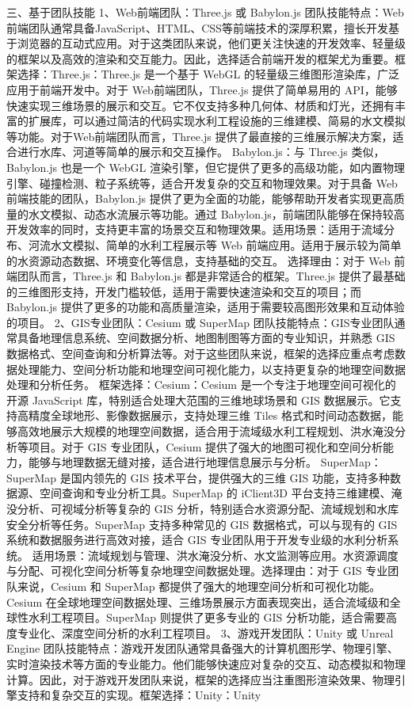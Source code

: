 {{{三、基于团队技能 1、Web前端团队：Three.js 或 Babylon.js 团队技能特点：Web前端团队通常具备JavaScript、HTML、CSS等前端技术的深厚积累，擅长开发基于浏览器的互动式应用。对于这类团队来说，他们更关注快速的开发效率、轻量级的框架以及高效的渲染和交互能力。因此，选择适合前端开发的框架尤为重要。框架选择：Three.js：Three.js 是一个基于 WebGL 的轻量级三维图形渲染库，广泛应用于前端开发中。对于 Web前端团队，Three.js 提供了简单易用的 API，能够快速实现三维场景的展示和交互。它不仅支持多种几何体、材质和灯光，还拥有丰富的扩展库，可以通过简洁的代码实现水利工程设施的三维建模、简易的水文模拟等功能。对于Web前端团队而言，Three.js 提供了最直接的三维展示解决方案，适合进行水库、河道等简单的展示和交互操作。 Babylon.js：与 Three.js 类似，Babylon.js 也是一个 WebGL 渲染引擎，但它提供了更多的高级功能，如内置物理引擎、碰撞检测、粒子系统等，适合开发复杂的交互和物理效果。对于具备 Web 前端技能的团队，Babylon.js 提供了更为全面的功能，能够帮助开发者实现更高质量的水文模拟、动态水流展示等功能。通过 Babylon.js，前端团队能够在保持较高开发效率的同时，支持更丰富的场景交互和物理效果。适用场景：适用于流域分布、河流水文模拟、简单的水利工程展示等 Web 前端应用。适用于展示较为简单的水资源动态数据、环境变化等信息，支持基础的交互。 选择理由：对于 Web 前端团队而言，Three.js 和 Babylon.js 都是非常适合的框架。Three.js 提供了最基础的三维图形支持，开发门槛较低，适用于需要快速渲染和交互的项目；而 Babylon.js 提供了更多的功能和高质量渲染，适用于需要较高图形效果和互动体验的项目。 2、GIS专业团队：Cesium 或 SuperMap 团队技能特点：GIS专业团队通常具备地理信息系统、空间数据分析、地图制图等方面的专业知识，并熟悉 GIS 数据格式、空间查询和分析算法等。对于这些团队来说，框架的选择应重点考虑数据处理能力、空间分析功能和地理空间可视化能力，以支持更复杂的地理空间数据处理和分析任务。 框架选择：Cesium：Cesium 是一个专注于地理空间可视化的开源 JavaScript 库，特别适合处理大范围的三维地球场景和 GIS 数据展示。它支持高精度全球地形、影像数据展示，支持处理三维 Tiles 格式和时间动态数据，能够高效地展示大规模的地理空间数据，适合用于流域级水利工程规划、洪水淹没分析等项目。对于 GIS 专业团队，Cesium 提供了强大的地图可视化和空间分析能力，能够与地理数据无缝对接，适合进行地理信息展示与分析。 SuperMap：SuperMap 是国内领先的 GIS 技术平台，提供强大的三维 GIS 功能，支持多种数据源、空间查询和专业分析工具。SuperMap 的 iClient3D 平台支持三维建模、淹没分析、可视域分析等复杂的 GIS 分析，特别适合水资源分配、流域规划和水库安全分析等任务。SuperMap 支持多种常见的 GIS 数据格式，可以与现有的 GIS 系统和数据服务进行高效对接，适合 GIS 专业团队用于开发专业级的水利分析系统。 适用场景：流域规划与管理、洪水淹没分析、水文监测等应用。水资源调度与分配、可视化空间分析等复杂地理空间数据处理。选择理由：对于 GIS 专业团队来说，Cesium 和 SuperMap 都提供了强大的地理空间分析和可视化功能。Cesium 在全球地理空间数据处理、三维场景展示方面表现突出，适合流域级和全球性水利工程项目。SuperMap 则提供了更多专业的 GIS 分析功能，适合需要高度专业化、深度空间分析的水利工程项目。 3、游戏开发团队：Unity 或 Unreal Engine 团队技能特点：游戏开发团队通常具备强大的计算机图形学、物理引擎、实时渲染技术等方面的专业能力。他们能够快速应对复杂的交互、动态模拟和物理计算。因此，对于游戏开发团队来说，框架的选择应当注重图形渲染效果、物理引擎支持和复杂交互的实现。框架选择：Unity：Unity }}}
